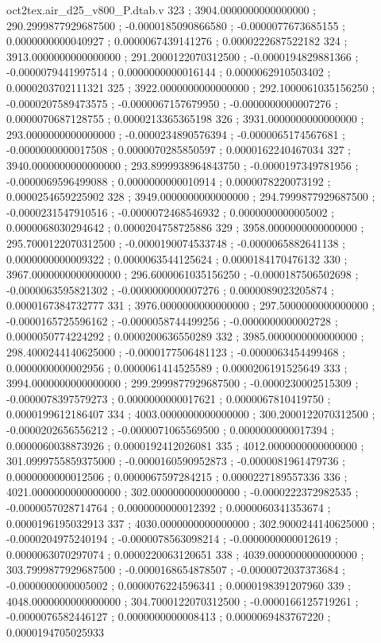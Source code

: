 \begin{filecontents}[overwrite]{oct2tex.air_d25_v800_P.dtab.v}
323 ; 3904.0000000000000000 ; 290.2999877929687500 ; -0.0000185090866580 ; -0.0000077673685155 ; 0.0000000000040927 ; 0.0000067439141276 ; 0.0000222687522182
324 ; 3913.0000000000000000 ; 291.2000122070312500 ; -0.0000194829881366 ; -0.0000079441997514 ; 0.0000000000016144 ; 0.0000062910503402 ; 0.0000203702111321
325 ; 3922.0000000000000000 ; 292.1000061035156250 ; -0.0000207589473575 ; -0.0000067157679950 ; -0.0000000000007276 ; 0.0000070687128755 ; 0.0000213365365198
326 ; 3931.0000000000000000 ; 293.0000000000000000 ; -0.0000234890576394 ; -0.0000065174567681 ; -0.0000000000017508 ; 0.0000070285850597 ; 0.0000162240467034
327 ; 3940.0000000000000000 ; 293.8999938964843750 ; -0.0000197349781956 ; -0.0000069596499088 ; 0.0000000000010914 ; 0.0000078220073192 ; 0.0000254659225902
328 ; 3949.0000000000000000 ; 294.7999877929687500 ; -0.0000231547910516 ; -0.0000072468546932 ; 0.0000000000005002 ; 0.0000068030294642 ; 0.0000204758725886
329 ; 3958.0000000000000000 ; 295.7000122070312500 ; -0.0000190074533748 ; -0.0000065882641138 ; 0.0000000000009322 ; 0.0000063544125624 ; 0.0000184170476132
330 ; 3967.0000000000000000 ; 296.6000061035156250 ; -0.0000187506502698 ; -0.0000063595821302 ; -0.0000000000007276 ; 0.0000089023205874 ; 0.0000167384732777
331 ; 3976.0000000000000000 ; 297.5000000000000000 ; -0.0000165725596162 ; -0.0000058744499256 ; -0.0000000000002728 ; 0.0000050774224292 ; 0.0000200636550289
332 ; 3985.0000000000000000 ; 298.4000244140625000 ; -0.0000177506481123 ; -0.0000063454499468 ; 0.0000000000002956 ; 0.0000061414525589 ; 0.0000206191525649
333 ; 3994.0000000000000000 ; 299.2999877929687500 ; -0.0000230002515309 ; -0.0000078397579273 ; 0.0000000000017621 ; 0.0000067810419750 ; 0.0000199612186407
334 ; 4003.0000000000000000 ; 300.2000122070312500 ; -0.0000202656556212 ; -0.0000071065569500 ; 0.0000000000017394 ; 0.0000060038873926 ; 0.0000192412026081
335 ; 4012.0000000000000000 ; 301.0999755859375000 ; -0.0000160590952873 ; -0.0000081961479736 ; 0.0000000000012506 ; 0.0000067597284215 ; 0.0000227189557336
336 ; 4021.0000000000000000 ; 302.0000000000000000 ; -0.0000222372982535 ; -0.0000057028714764 ; 0.0000000000012392 ; 0.0000060341353674 ; 0.0000196195032913
337 ; 4030.0000000000000000 ; 302.9000244140625000 ; -0.0000204975240194 ; -0.0000078563098214 ; -0.0000000000012619 ; 0.0000063070297074 ; 0.0000220063120651
338 ; 4039.0000000000000000 ; 303.7999877929687500 ; -0.0000168654878507 ; -0.0000072037373684 ; -0.0000000000005002 ; 0.0000076224596341 ; 0.0000198391207960
339 ; 4048.0000000000000000 ; 304.7000122070312500 ; -0.0000166125719261 ; -0.0000076582446127 ; 0.0000000000008413 ; 0.0000069483767220 ; 0.0000194705025933

\end{filecontents}
